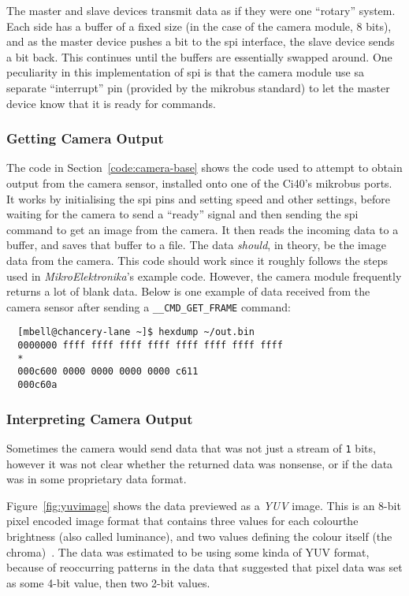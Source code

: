 The master and slave devices transmit data as if they were one ``rotary''
system. Each side has a buffer of a fixed size (in the case of the camera
module, 8 bits), and as the master device pushes a bit to the \acrshort{spi}
interface, the slave device sends a bit back. This continues until the
buffers are essentially swapped around. One peculiarity
in this implementation of \acrshort{spi} is that the camera module use sa
separate ``interrupt'' pin (provided by the \gls{mikrobus} standard) to let
the master device know that it is ready for commands.

\subsubsection{Getting Camera Output}
The code in Section~\ref{code:camera-base} shows the code used to attempt to
obtain output from the camera sensor, installed onto one of the Ci40's
\gls{mikrobus} ports. It works by initialising the \acrshort{spi} pins and
setting speed and other settings, before waiting for the camera to send a
``ready'' signal and then sending the \acrshort{spi} command to get an image
from the camera. It then reads the incoming data to a buffer, and saves that
buffer to a file. The data \textit{should}, in theory, be the image data from
the camera. This code should work since it roughly follows the steps used in
\textit{MikroElektronika}'s example code. However, the camera module
frequently returns a lot of blank data. Below is one example of data received
from the camera sensor after sending a \texttt{\_\_CMD\_GET\_FRAME} command:

\begin{verbatim}
  [mbell@chancery-lane ~]$ hexdump ~/out.bin
  0000000 ffff ffff ffff ffff ffff ffff ffff ffff
  *
  000c600 0000 0000 0000 0000 c611               
  000c60a
\end{verbatim}

\subsubsection{Interpreting Camera Output}
Sometimes the camera would send data that was not just a stream of \texttt{1}
bits, however it was not clear whether the returned data was nonsense, or if
the data was in some proprietary data format.

Figure~\ref{fig:yuvimage} shows the data previewed as a \textit{YUV} image.
This is an 8-bit pixel encoded image format that contains three values for
each colour\textemdash{}the brightness (also called luminance), and two
values defining the colour itself (the chroma)~\cite{softpixelyuv}. The data
was estimated to be using some kinda of YUV format, because of reoccurring
patterns in the data that suggested that pixel data was set as some 4-bit
value, then two 2-bit values.

